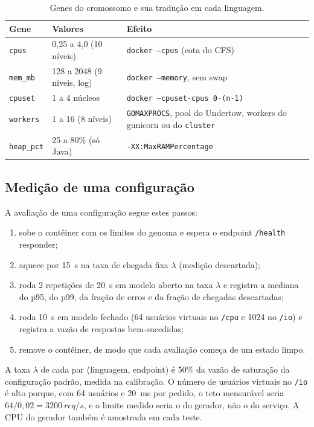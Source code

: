 \documentclass[11pt,a4paper]{article}
\begin{document}
\begin{table}[ht]
\centering
\caption{Genes do cromossomo e sua tradução em cada linguagem.}
\label{tab:genes}
\begin{tabular}{llp{6.2cm}}
\toprule
Gene & Valores & Efeito \\
\midrule
\texttt{cpus} & 0,25 a 4,0 (10 níveis) & \texttt{docker --cpus} (cota do CFS) \\
\texttt{mem\_mb} & 128 a 2048 (9 níveis, log) & \texttt{docker --memory}, sem swap \\
\texttt{cpuset} & 1 a 4 núcleos & \texttt{docker --cpuset-cpus 0-(n-1)} \\
\texttt{workers} & 1 a 16 (8 níveis) & \texttt{GOMAXPROCS}, pool do Undertow, workers do gunicorn ou do \texttt{cluster} \\
\texttt{heap\_pct} & 25 a 80\% (só Java) & \texttt{-XX:MaxRAMPercentage} \\
\bottomrule
\end{tabular}
\end{table}

\subsection{Medição de uma configuração}

A avaliação de uma configuração segue estes passos:
\begin{enumerate}
  \item sobe o contêiner com os limites do genoma e espera o endpoint \texttt{/health} responder;
  \item aquece por \SI{15}{s} na taxa de chegada fixa $\lambda$ (medição descartada);
  \item roda 2 repetições de \SI{20}{s} em modelo aberto na taxa $\lambda$ e registra a mediana do p95, do p99, da fração de erros e da fração de chegadas descartadas;
  \item roda \SI{10}{s} em modelo fechado (64 usuários virtuais no \texttt{/cpu} e 1024 no \texttt{/io}) e registra a vazão de respostas bem-sucedidas;
  \item remove o contêiner, de modo que cada avaliação começa de um estado limpo.
\end{enumerate}
A taxa $\lambda$ de cada par (linguagem, endpoint) é $50\%$ da vazão de saturação da configuração padrão, medida na
calibração. O número de usuários virtuais no \texttt{/io} é alto porque, com 64 usuários e \SI{20}{ms} por pedido, o
teto mensurável seria $64/0{,}02 = \SI{3200}{req/s}$, e o limite medido seria o do gerador, não o do serviço.
A CPU do gerador também é amostrada em cada teste.
\end{document}
